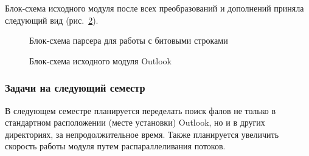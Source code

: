 Блок-схема исходного модуля после всех преобразований и дополнений приняла следующий вид
(рис.~\ref{ser_5:ser_5}).

\begin{figure}[h!]
\caption{Блок-схема парсера для работы с битовыми строками}
\label{ser_4:ser_4}
\end{figure} 

\begin{figure}[h!]
\caption{Блок-схема исходного модуля Outlook}
\label{ser_5:ser_5}
\end{figure} 

\subsubsection{Задачи на следующий семестр}

В следующем семестре планируется переделать поиск фалов не только в стандартном 
расположении (месте установки) Outlook, но и в других директориях, за непродолжительное 
время. Также планируется увеличить скорость работы модуля путем распараллеливания  потоков.

\clearpage
